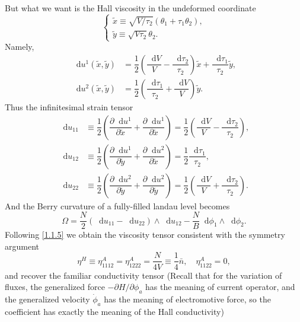 \documentclass[10pt,nofootinbib,letterpaper]{revtex4}
\newcommand*\dd{\mathop{}\!\mathrm{d}}
\begin{document}
		\noindent But what we want is the Hall viscosity in the undeformed coordinate
		\begin{equation*}
			\begin{cases}
				\widetilde{x}\equiv\sqrt{V/\tau_2}(\theta_1+\tau_1\theta_2),\\[0.8em]
				\widetilde{y}\equiv\sqrt{V\tau_2}\theta_2.
			\end{cases}
		\end{equation*}
		Namely,
		\begin{align*}
			\dd u^1(\widetilde{x},\widetilde{y})&=\dfrac{1}{2}\left(\dfrac{\dd V}{V}-\dfrac{\dd\tau_2}{\tau_2}\right)\widetilde{x}+\dfrac{\dd\tau_1}{\tau_2}\widetilde{y},\\
			\dd u^2(\widetilde{x},\widetilde{y})&=\dfrac{1}{2}\left(\dfrac{\dd\tau_1}{\tau_2}+\dfrac{\dd V}{V}\right)\widetilde{y}.
		\end{align*}
		Thus the infinitesimal strain tensor
		\begin{align*}
			\dd u_{11}&\equiv\dfrac{1}{2}\left(\dfrac{\partial\dd u^1}{\partial \widetilde{x}}+\dfrac{\partial\dd u^1}{\partial \widetilde{x}}\right)=\dfrac{1}{2}\left(\dfrac{\dd V}{V}-\dfrac{\dd\tau_2}{\tau_2}\right),\\
			\dd u_{12}&\equiv\dfrac{1}{2}\left(\dfrac{\partial\dd u^1}{\partial \widetilde{y}}+\dfrac{\partial\dd u^2}{\partial \widetilde{x}}\right)=\dfrac{1}{2}\dfrac{\dd\tau_1}{\tau_2},\\
			\dd u_{22}&\equiv\dfrac{1}{2}\left(\dfrac{\partial\dd u^2}{\partial \widetilde{y}}+\dfrac{\partial\dd u^2}{\partial \widetilde{y}}\right)=\dfrac{1}{2}\left(\dfrac{\dd V}{V}+\dfrac{\dd\tau_2}{\tau_2}\right).
		\end{align*}
		And the Berry curvature of a fully-filled landau level becomes
		\begin{equation}\label{3.1.4}
			\Omega=\dfrac{N}{2}(\dd u_{11}-\dd u_{22})\wedge\dd u_{12}-\dfrac{N}{B}\dd\phi_1\wedge\dd\phi_2.
		\end{equation}
		Following \eqref{1.1.5} we obtain the viscosity tensor consistent with the symmetry argument
		\begin{equation}\label{3.1.5}
			\eta^H\equiv\eta^A_{1112}=\eta^A_{1222}=\dfrac{N}{4V}\equiv\dfrac{1}{4}\bar{n},\quad\eta^A_{1122}=0,
		\end{equation}
		and recover the familiar conductivity tensor (Recall that for the variation of fluxes, the generalized force $-\partial H/\partial \phi_a$ has the meaning of current operator, and the generalized velocity $\dot{\phi}_a$ has the meaning of electromotive force, so the coefficient has exactly the meaning of the Hall conductivity)
\end{document}
